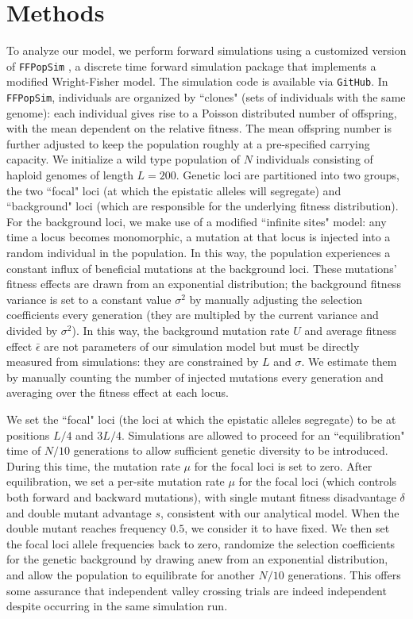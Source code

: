 \documentclass[rmp]{revtex4}
\begin{document}
\section*{Methods}

To analyze our model, we perform forward simulations using a customized version of \texttt{FFPopSim} \citep{zanini_2012}, a discrete time forward simulation package that implements a modified Wright-Fisher model.
The simulation code is available via \texttt{GitHub}.
In \texttt{FFPopSim}, individuals are organized by ``clones" (sets of individuals with the same genome): each individual gives rise to a Poisson distributed number of offspring, with the mean dependent on the relative fitness.
The mean offspring number is further adjusted to keep the population roughly at a pre-specified carrying capacity.
We initialize a wild type population of $N$ individuals consisting of haploid genomes of length $L = 200$.
Genetic loci are partitioned into two groups, the two ``focal" loci (at which the epistatic alleles will segregate) and ``background" loci (which are responsible for the underlying fitness distribution).
For the background loci, we make use of a modified ``infinite sites" model: any time a locus becomes monomorphic, a mutation at that locus is injected into a random individual in the population.
In this way, the population experiences a constant influx of beneficial mutations at the background loci.
These mutations' fitness effects are drawn from an exponential distribution; the background fitness variance is set to a constant value $\sigma^2$ by manually adjusting the selection coefficients every generation (they are multipled by the current variance and divided by $\sigma^2$).
In this way, the background mutation rate $U$ and average fitness effect $\bar{\epsilon}$ are not parameters of our simulation model but must be directly measured from simulations: they are constrained by $L$ and $\sigma$.
We estimate them by manually counting the number of injected mutations every generation and averaging over the fitness effect at each locus.

We set the ``focal" loci (the loci at which the epistatic alleles segregate) to be at positions $L/4$ and $3L/4$.
Simulations are allowed to proceed for an ``equilibration" time of $N/10$ generations to allow sufficient genetic diversity to be introduced.
During this time, the mutation rate $\mu$ for the focal loci is set to zero.
After equilibration, we set a per-site mutation rate $\mu$ for the focal loci (which controls both forward and backward mutations), with single mutant fitness disadvantage $\delta$ and double mutant advantage $s$, consistent with our analytical model.
When the double mutant reaches frequency $0.5$, we consider it to have fixed.
We then set the focal loci allele frequencies back to zero, randomize the selection coefficients for the genetic background by drawing anew from an exponential distribution, and allow the population to equilibrate for another $N/10$ generations.
This offers some assurance that independent valley crossing trials are indeed independent despite occurring in the same simulation run.
\end{document}
